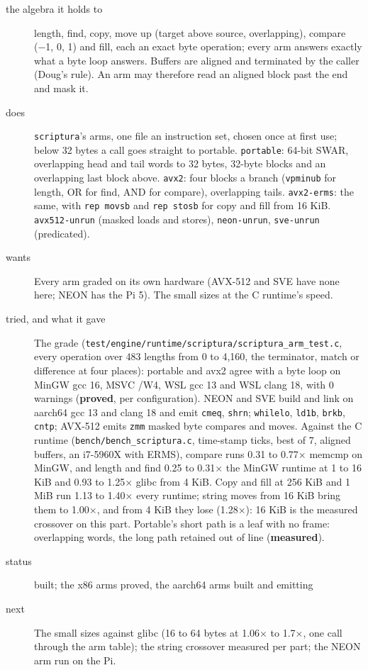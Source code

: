 \begin{description}
\item[{the algebra it holds to}] length, find, copy, move up (target above source, overlapping), compare (−1, 0, 1) and fill, each an exact byte operation; every arm answers exactly what a byte loop answers. Buffers are aligned and terminated by the caller (Doug's rule). An arm may therefore read an aligned block past the end and mask it.
\item[{does}] \texttt{scriptura}'s arms, one file an instruction set, chosen once at first use; below 32 bytes a call goes straight to portable. \texttt{portable}: 64-bit SWAR, overlapping head and tail words to 32 bytes, 32-byte blocks and an overlapping last block above. \texttt{avx2}: four blocks a branch (\texttt{vpminub} for length, OR for find, AND for compare), overlapping tails. \texttt{avx2-\allowbreak{}erms}: the same, with \texttt{rep movsb} and \texttt{rep stosb} for copy and fill from 16 KiB. \texttt{avx512-\allowbreak{}unrun} (masked loads and stores), \texttt{neon-\allowbreak{}unrun}, \texttt{sve-\allowbreak{}unrun} (predicated).
\item[{wants}] Every arm graded on its own hardware (AVX-512 and SVE have none here; NEON has the Pi 5). The small sizes at the C runtime's speed.
\item[{tried, and what it gave}] The grade (\texttt{test/\allowbreak{}engine/\allowbreak{}runtime/\allowbreak{}scriptura/\allowbreak{}scriptura\_\allowbreak{}arm\_\allowbreak{}test.\allowbreak{}c}, every operation over 483 lengths from 0 to 4,160, the terminator, match or difference at four places): portable and avx2 agree with a byte loop on MinGW gcc 16, MSVC /W4, WSL gcc 13 and WSL clang 18, with 0 warnings (\textbf{proved}, per configuration). NEON and SVE build and link on aarch64 gcc 13 and clang 18 and emit \texttt{cmeq}, \texttt{shrn}; \texttt{whilelo}, \texttt{ld1b}, \texttt{brkb}, \texttt{cntp}; AVX-512 emits \texttt{zmm} masked byte compares and moves. Against the C runtime (\texttt{bench/\allowbreak{}bench\_\allowbreak{}scriptura.\allowbreak{}c}, time-stamp ticks, best of 7, aligned buffers, an i7-5960X with ERMS), compare runs 0.31 to 0.77× memcmp on MinGW, and length and find 0.25 to 0.31× the MinGW runtime at 1 to 16 KiB and 0.93 to 1.25× glibc from 4 KiB. Copy and fill at 256 KiB and 1 MiB run 1.13 to 1.40× every runtime; string moves from 16 KiB bring them to 1.00×, and from 4 KiB they lose (1.28×): 16 KiB is the measured crossover on this part. Portable's short path is a leaf with no frame: overlapping words, the long path retained out of line (\textbf{measured}).
\item[{status}] built; the x86 arms proved, the aarch64 arms built and emitting
\item[{next}] The small sizes against glibc (16 to 64 bytes at 1.06× to 1.7×, one call through the arm table); the string crossover measured per part; the NEON arm run on the Pi.
\end{description}

